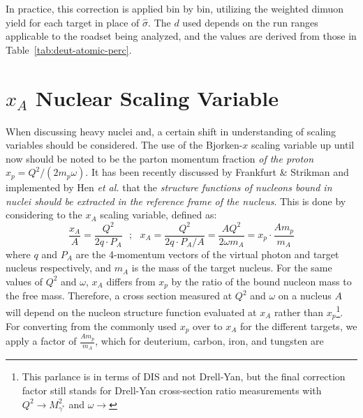 In practice, this correction is applied bin by bin, utilizing the weighted dimuon yield for each target in place of $\hat{\sigma}$. The $d$ used depends on the run ranges applicable to the roadset being analyzed, and the values are derived from those in Table~\ref{tab:deut-atomic-perc}.

\section{\texorpdfstring{$x_A$ Nuclear Scaling Variable}{xA Nuclear Scaling Variable}}

When discussing heavy nuclei and, a certain shift in understanding of scaling variables should be considered. The use of the Bjorken-$x$ scaling variable up until now should be noted to be the parton momentum fraction \emph{of the proton} $x_p = Q^2/(2 m_p \omega)$. It has been recently discussed by Frankfurt \& Strikman\cite{Frankfurt:2012qs} and implemented by Hen \emph{et al.}\cite{Hen:2013oha} that the \emph{structure functions of nucleons bound in nuclei should be extracted in the reference frame of the nucleus}. This is done by considering to the $x_A$ scaling variable, defined as:
\begin{equation}
\frac{x_A}{A} = \frac{Q^2}{2q\cdot P_A} \ \ \ ;\ \ \ x_A = \frac{Q^2}{2q\cdot P_A/A} = \frac{AQ^2}{2\omega m_A} = x_p \cdot \frac{A m_p}{m_A}
\end{equation}
where $q$ and $P_A$ are the 4-momentum vectors of the virtual photon and target nucleus respectively, and $m_A$ is the mass of the target nucleus. For the same values of $Q^2$ and $\omega$, $x_A$ differs from $x_p$ by the ratio of the bound nucleon mass to the free mass. Therefore, a cross section measured at $Q^2$ and $\omega$ on a nucleus $A$ will depend on the nucleon structure function evaluated at $x_A$ rather than $x_p$\footnote{This parlance is in terms of DIS and not Drell-Yan, but the final correction factor still stands for Drell-Yan cross-section ratio measurements with $Q^2\rightarrow M_{\gamma^*}^2$ and $\omega \rightarrow$}. For converting from the commonly used $x_p$ over to $x_A$ for the different targets, we apply a factor of $\frac{A m_p}{m_A}$, which for deuterium, carbon, iron, and tungsten are  

